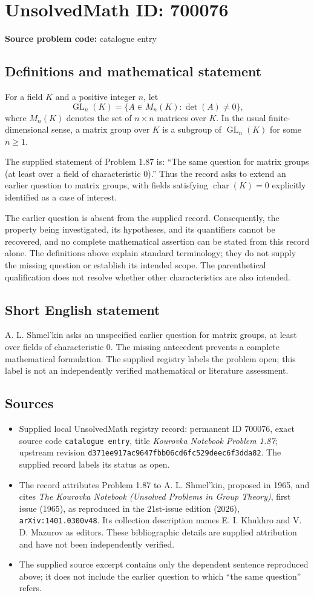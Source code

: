 \documentclass[11pt]{article}
\begin{document}
\section*{UnsolvedMath ID: 700076}
\textbf{Source problem code:} catalogue entry
\subsection{Definitions and mathematical statement}
For a field \(K\) and a positive integer \(n\), let
\[
\operatorname{GL}_n(K)=\{A\in M_n(K):\det(A)\ne 0\},
\]
where \(M_n(K)\) denotes the set of \(n\times n\) matrices over \(K\). In the usual finite-dimensional sense, a matrix group over \(K\) is a subgroup of \(\operatorname{GL}_n(K)\) for some \(n\ge 1\).

The supplied statement of Problem 1.87 is: ``The same question for matrix groups (at least over a field of characteristic 0).'' Thus the record asks to extend an earlier question to matrix groups, with fields satisfying \(\operatorname{char}(K)=0\) explicitly identified as a case of interest.

The earlier question is absent from the supplied record. Consequently, the property being investigated, its hypotheses, and its quantifiers cannot be recovered, and no complete mathematical assertion can be stated from this record alone. The definitions above explain standard terminology; they do not supply the missing question or establish its intended scope. The parenthetical qualification does not resolve whether other characteristics are also intended.
\subsection{Short English statement}
A. L. Shmel'kin asks an unspecified earlier question for matrix groups, at least over fields of characteristic \(0\). The missing antecedent prevents a complete mathematical formulation. The supplied registry labels the problem open; this label is not an independently verified mathematical or literature assessment.
\subsection{Sources}
\begin{itemize}
\item Supplied local UnsolvedMath registry record: permanent ID \(700076\), exact source code \texttt{catalogue entry}, title \emph{Kourovka Notebook Problem 1.87}; upstream revision \texttt{d371ee917ac9647fbb06cd6fc529deec6f3dda82}. The supplied record labels its status as open.
\item The record attributes Problem 1.87 to A. L. Shmel'kin, proposed in 1965, and cites \emph{The Kourovka Notebook (Unsolved Problems in Group Theory)}, first issue (1965), as reproduced in the 21st-issue edition (2026), \texttt{arXiv:1401.0300v48}. Its collection description names E. I. Khukhro and V. D. Mazurov as editors. These bibliographic details are supplied attribution and have not been independently verified.
\item The supplied source excerpt contains only the dependent sentence reproduced above; it does not include the earlier question to which ``the same question'' refers.
\end{itemize}
\end{document}
